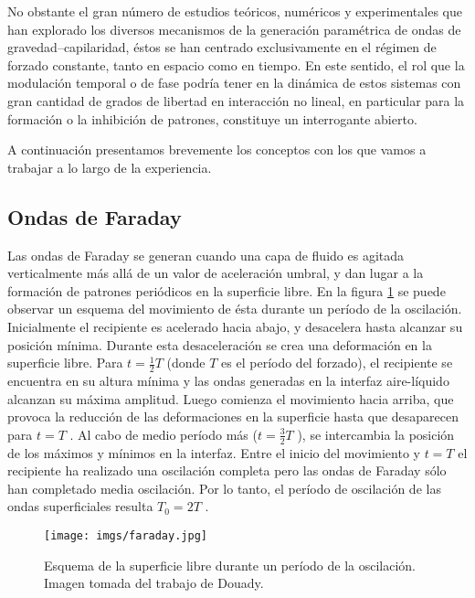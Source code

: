 \documentclass[../main.tex]{subfiles}
\begin{document}
No obstante el gran número de estudios teóricos, numéricos y experimentales que han explorado los diversos mecanismos de la generación paramétrica de ondas de gravedad–capilaridad, éstos se han centrado exclusivamente en el régimen de forzado constante, tanto en espacio como en tiempo. En este sentido, el rol que la modulación temporal o de fase podría tener en la dinámica de estos sistemas con gran cantidad de grados de libertad en interacción no lineal, en particular para la formación o la inhibición de patrones, constituye un interrogante abierto.

A continuación presentamos brevemente los conceptos con los que vamos a trabajar a lo largo de la experiencia. 

\subsection{Ondas de Faraday}
Las ondas de Faraday se generan cuando una capa de fluido es agitada verticalmente más allá de un valor de aceleración umbral, y dan lugar a la formación de patrones periódicos en la superficie libre. En la figura \ref{fig:faraday} se puede observar un esquema del movimiento de ésta durante un período de la oscilación. Inicialmente el recipiente es acelerado hacia abajo, y desacelera hasta alcanzar su posición mínima. Durante esta desaceleración se crea una deformación en la superficie libre. Para
$t = \frac{1}{2}T$ (donde $T$ es el período del forzado), el recipiente se encuentra en su altura mínima y las ondas generadas en la interfaz aire-líquido alcanzan su máxima amplitud. Luego comienza el movimiento hacia arriba, que provoca la reducción de las deformaciones en la superficie hasta que desaparecen para $t = T$ . Al cabo de medio período más ($t = \frac{3}{2}T$ ), se intercambia la posición de los máximos y mínimos en la interfaz. Entre el inicio del movimiento y $t = T$ el recipiente ha realizado una oscilación completa pero las ondas de
Faraday sólo han completado media oscilación. Por lo tanto, el período de oscilación de las ondas superficiales resulta $T_0 = 2T$ .

\begin{figure}[H]
    \centering
    \texttt{[image: imgs/faraday.jpg]}
    \caption{Esquema de la superficie libre durante un período de la oscilación. Imagen tomada del trabajo de Douady\cite{douady_experimental_1990}.}
    \label{fig:faraday}
\end{figure}
\end{document}

